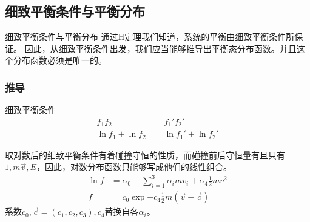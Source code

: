 \documentclass{if-beamer}
\begin{document}
\subsection{细致平衡条件与平衡分布}
\begin{frame}{细致平衡条件与平衡分布}
    通过H定理我们知道，系统的平衡由细致平衡条件所保证。
    因此，从细致平衡条件出发，我们应当能够推导出平衡态分布函数。并且这个分布函数必须是唯一的。
\end{frame}
\begin{frame}
    \frametitle{推导}
        \begin{block}{细致平衡条件}
            \begin{equation*}
                \begin{aligned}
                    f_1f_2&=f_1'f_2'\\
                    \ln{f_1}+\ln{f_2}&=\ln{f_1'}+\ln{f_2'}
                \end{aligned}
            \end{equation*}
        \end{block}
        \begin{block}{}
            取对数后的细致平衡条件有着碰撞守恒的性质，而碰撞前后守恒量有且只有$1,m\vec{v},E$，因此，对数分布函数只能够写成他们的线性组合。
            \begin{equation*}
                \begin{aligned}
                    \ln{f}&=\alpha_0+\sum_{i=1}^{3}{\alpha_imv_i}+\alpha_4\frac12mv^2\\
                    f&=c_0\exp{-c_4\frac12m(\vec{v}-\vec{c})}
                \end{aligned}
            \end{equation*}
            系数$c_0,\vec{c}=(c_1,c_2,c_3),c_4$替换自各$\alpha_i$。
        \end{block}
    

\end{frame}
\end{document}
